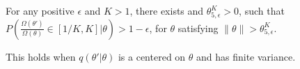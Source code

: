 
\begin{assumption}
For any positive $\epsilon$ and  $K > 1$, there exists and $\theta_{5,\epsilon}^K> 0$, such that $P(\frac{\Omega(\theta')}{\Omega(\theta)} \in [1/K, K] | \theta) > 1 - \epsilon$, for $\theta$ satisfying $\| \theta \|  > \theta_{5,\epsilon}^K$.
  \label{asmp:omega}
\end{assumption}
This holds when $q(\theta'|\theta)$ is a centered on $\theta$ and has 
finite variance.




